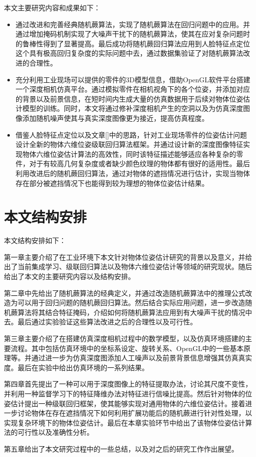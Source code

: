 本文主要研究内容和成果如下：
\begin{itemize}
\item 通过改进和完善经典随机蕨算法，实现了随机蕨算法在回归问题中的应用。并通过增加掩码机制实现了大噪声干扰下的随机蕨算法，使其在应对复杂问题时的鲁棒性得到了显著提高。最后成功将随机蕨回归算法应用到人脸特征点定位这个具有极高回归复杂度的实际问题中去，通过数据集验证了对随机蕨算法改进的合理性。
\item 充分利用工业现场可以提供的零件的3D模型信息，借助OpenGL软件平台搭建一个深度相机仿真平台。通过模拟零件在相机视角下的各个位姿，并添加对应的背景以及前景信息，在短时间内生成大量的仿真数据用于后续对物体位姿估计模型的训练。同时，本文将通过修补深度相机产生的空洞以及为仿真深度图像添加随机噪声使其与真实深度图像更为接近，提高仿真程度。

\item 借鉴人脸特征点定位以及文章[]中的思路，针对工业现场零件的位姿估计问题设计全新的物体六维位姿级联回归算法框架。并通过设计新的深度图像特征实现物体六维位姿估计算法的高效性，同时该特征描述能够适应各种复杂的零件，对于有较高几何复杂度或者缺少颜色纹理的物体都有很好的适用性。最后利用改进后的随机蕨回归算法，通过对物体的遮挡情况进行估计，实现当物体存在部分被遮挡情况下也能得到较为理想的物体位姿估计结果。
\end{itemize}


\section{本文结构安排}

本文结构安排如下：

第一章主要介绍了在工业环境下本文针对物体位姿估计研究的背景以及意义，并给出了当前集成学习、级联回归算法以及物体六维位姿估计等领域的研究现状。随后给出了本文的主要研究内容以及结构安排。

第二章中先给出了随机蕨算法的经典定义，并通过改造随机蕨算法中的推理公式改造为可以用于回归问题的随机蕨回归算法。然后结合实际应用问题，进一步改造随机蕨算法将其结合特征掩码，介绍如何将随机蕨算法应用到有大噪声干扰的情况中去。最后通过实验验证这些算法改进之后的合理性以及可行性。

第三章主要介绍了在搭建仿真深度相机过程中的数学模型，以及仿真环境搭建的主要流程。其中包括仿真环境中的坐标系设定、旋转关系、OpenGL中的一些基本原理等。并通过进一步为仿真深度图添加人工噪声以及前景背景信息增强其仿真真实度。最后在实验中给出仿真环境的一系列结果。

第四章首先提出了一种可以用于深度图像上的特征提取办法，讨论其尺度不变性，并利用一种监督学习下的特征降维办法对特征进行信噪比提高。然后针对物体的位姿估计提出一种级联回归框架，使其能够实现对通用物体的六维位姿估计。接着进一步讨论物体在存在遮挡情况下如何利用扩展功能后的随机蕨进行针对性处理，以实现复杂环境下的物体位姿估计。最后在本章实验环节中给出了该物体位姿估计算法的可行性以及准确性分析。

第五章给出了本文研究过程中的一些总结，以及对之后的研究工作作出展望。















